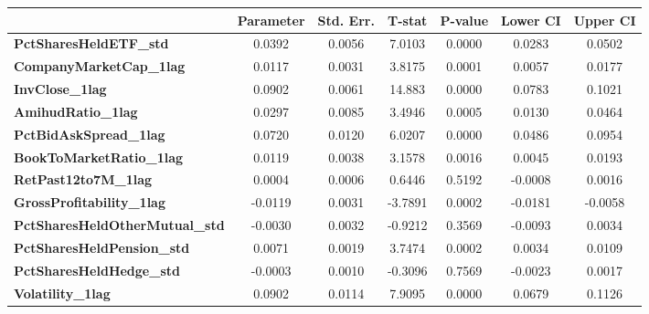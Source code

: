 \begin{center}
\begin{tabular}{lclc}
\bottomrule
\end{tabular}
\begin{tabular}{lcccccc}
                                       & \textbf{Parameter} & \textbf{Std. Err.} & \textbf{T-stat} & \textbf{P-value} & \textbf{Lower CI} & \textbf{Upper CI}  \\
\midrule
\textbf{PctSharesHeldETF\_std}         &       0.0392       &       0.0056       &      7.0103     &      0.0000      &       0.0283      &       0.0502       \\
\textbf{CompanyMarketCap\_1lag}        &       0.0117       &       0.0031       &      3.8175     &      0.0001      &       0.0057      &       0.0177       \\
\textbf{InvClose\_1lag}                &       0.0902       &       0.0061       &      14.883     &      0.0000      &       0.0783      &       0.1021       \\
\textbf{AmihudRatio\_1lag}             &       0.0297       &       0.0085       &      3.4946     &      0.0005      &       0.0130      &       0.0464       \\
\textbf{PctBidAskSpread\_1lag}         &       0.0720       &       0.0120       &      6.0207     &      0.0000      &       0.0486      &       0.0954       \\
\textbf{BookToMarketRatio\_1lag}       &       0.0119       &       0.0038       &      3.1578     &      0.0016      &       0.0045      &       0.0193       \\
\textbf{RetPast12to7M\_1lag}           &       0.0004       &       0.0006       &      0.6446     &      0.5192      &      -0.0008      &       0.0016       \\
\textbf{GrossProfitability\_1lag}      &      -0.0119       &       0.0031       &     -3.7891     &      0.0002      &      -0.0181      &      -0.0058       \\
\textbf{PctSharesHeldOtherMutual\_std} &      -0.0030       &       0.0032       &     -0.9212     &      0.3569      &      -0.0093      &       0.0034       \\
\textbf{PctSharesHeldPension\_std}     &       0.0071       &       0.0019       &      3.7474     &      0.0002      &       0.0034      &       0.0109       \\
\textbf{PctSharesHeldHedge\_std}       &      -0.0003       &       0.0010       &     -0.3096     &      0.7569      &      -0.0023      &       0.0017       \\
\textbf{Volatility\_1lag}              &       0.0902       &       0.0114       &      7.9095     &      0.0000      &       0.0679      &       0.1126       \\

\end{tabular}
\end{center}

